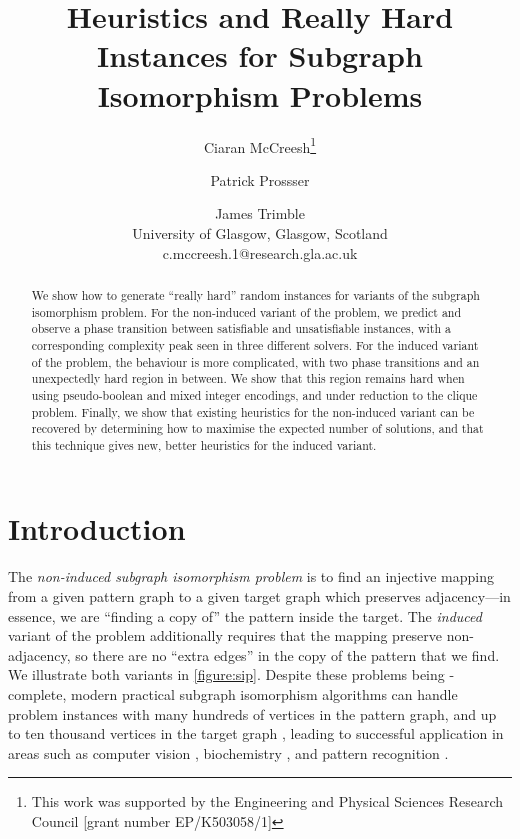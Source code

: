 \documentclass[letterpaper]{article}
\title{Heuristics and Really Hard Instances for Subgraph Isomorphism Problems}
\author{Ciaran McCreesh\thanks{This work was supported by the Engineering and Physical Sciences
    Research Council [grant number EP/K503058/1]} \and Patrick Prossser \and James Trimble \\
University of Glasgow, Glasgow, Scotland \\
c.mccreesh.1@research.gla.ac.uk}
\begin{document}
\maketitle

\begin{abstract}
    We show how to generate ``really hard'' random instances for variants of the subgraph
    isomorphism problem. For the non-induced variant of the problem, we predict and observe a phase
    transition between satisfiable and unsatisfiable instances, with a corresponding complexity peak
    seen in three different solvers. For the induced variant of the problem, the behaviour is more
    complicated, with two phase transitions and an unexpectedly hard region in between. We show that
    this region remains hard when using pseudo-boolean and mixed integer encodings, and under
    reduction to the clique problem. Finally, we show that existing heuristics for the non-induced
    variant can be recovered by determining how to maximise the expected number of solutions, and
    that this technique gives new, better heuristics for the induced variant.
\end{abstract}

\section{Introduction}

The \emph{non-induced subgraph isomorphism problem} is to find an injective mapping from a given
pattern graph to a given target graph which preserves adjacency---in essence, we are ``finding a
copy of'' the pattern inside the target. The \emph{induced} variant of the problem additionally
requires that the mapping preserve non-adjacency, so there are no ``extra edges'' in the copy of the
pattern that we find. We illustrate both variants in \cref{figure:sip}.
Despite these problems being \NP-complete, modern practical subgraph isomorphism algorithms can
handle problem instances with many hundreds of vertices in the pattern graph, and up to ten thousand
vertices in the target graph \citep{Cordella:2004,Solnon:2010,Audemard:2014,McCreesh:2015}, leading
to successful application in areas such as computer
vision \citep{Damiand:2011,Solnon:2015}, biochemistry \citep{Giugno:2013}, and pattern recognition
\citep{Conte:2004}.
\end{document}
